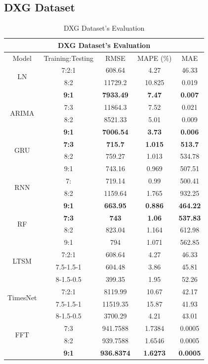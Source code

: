 \documentclass{ieeeojies}
\begin{document}
\subsection{DXG Dataset} 
\begin{table}[H]
  \centering
  \begin{tabular}{|c|c|c|c|c|}
         \hline
         \multicolumn{5}{|c|}{\textbf{DXG Dataset's Evaluation}}\\
         \hline
         \centering Model & Training:Testing & RMSE & MAPE (\%) & MAE\\
         \hline
         \multirow{2}{*}{LN} & 7:2:1 & 608.64 & 4.27 & 46.33 \\ & 8:2 & 11729.2 & 10.825 & 0.019 \\ & \textbf{9:1} & \textbf{7933.49} & \textbf{7.47} & \textbf{0.007}\\
         \hline
         \multirow{2}{*}{ARIMA} & 7:3&11864.3&7.52&0.021\\ & 8:2&8521.33&5.01&0.009 \\ & \textbf{9:1} & \textbf{7006.54} & \textbf{3.73} & \textbf{0.006}\\
         \hline
         \multirow{2}{*}{GRU} & \textbf{7:3}& \textbf{715.7} & \textbf{1.015} & \textbf{513.7} \\ & 8:2 & 759.27 & 1.013 & 534.78  \\ & 9:1 & 743.16	&0.969&507.51\\
         \hline
         \multirow{2}{*}{RNN} & 7: &  719.14 &  0.99 &  500.41 \\ & 8:2 &  1159.64 & 1.765 &  932.25 \\ & \textbf{9:1} & \textbf{663.95} & \textbf{0.886} & \textbf{464.22} \\
         \hline
         \multirow{2}{*}{RF} & \textbf{7:3}	& \textbf{743} & \textbf{1.06} &  \textbf{537.83} \\ & 8:2 & 823.04 & 1.164 & 612.98 \\ & 9:1 & 794 & 1.071 & 562.85\\
         \hline
         \multirow{2}{*}{LTSM} & 7:2:1 & 608.64 & 4.27 & 46.33 \\ & 7.5-1.5-1 & 604.48 & 3.86 & 45.81 \\ & 8-1.5-0.5 & 399.35	&1.95&52.26\\
         \hline
         \multirow{2}{*}{TimesNet} & 7:2:1 & 8119.99 & 10.67 & 42.17 \\ & 7.5-1.5-1 & 11519.35 & 15.87 & 41.93 \\ & 8-1.5-0.5 & 3700.29	& 4.21 &43.01\\
         \hline
         \multirow{2}{*}{FFT} & 7:3 & 941.7588 &  1.7384 &  0.0005 \\ & 8:2 & 939.7588 &  1.6546 &  0.0005 \\ & \textbf{9:1} & \textbf{936.8374} & \textbf{1.6273} & \textbf{0.0005}\\
         \hline
    \end{tabular}
    \caption{DXG Dataset's Evaluation}

    \label{vcbresult}
\end{table}
\end{document}
